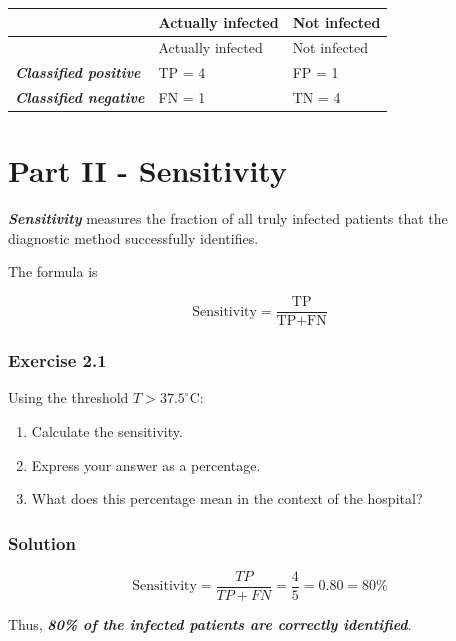 \documentclass[10pt]{article}
\begin{document}
\begingroup
\small
\setlength{\tabcolsep}{4pt}
\begin{longtable}{l|l|l}
\rule{0pt}{2.4ex} & Actually infected & Not infected \\[3pt]
\hline
\endfirsthead
\rule{0pt}{2.4ex} & Actually infected & Not infected \\[3pt]
\hline
\endhead
\textbf{\textit{Classified positive}} & TP = 4 & FP = 1 \\[1.5pt]
\textbf{\textit{Classified negative}} & FN = 1 & TN = 4 \\[1.5pt]
\end{longtable}
\endgroup
\par\endgroup

\clearpage
\section*{Part II - Sensitivity}
\textbf{\textit{Sensitivity}} measures the fraction of all truly infected patients that the diagnostic method successfully identifies.

The formula is

\[
{
\text{Sensitivity}
=
\frac{\text{TP}}{\text{TP}+\text{FN}}
}
\]

\subsubsection*{Exercise 2.1}
Using the threshold $T>37.5^\circ\mathrm{C}$:

\begin{enumerate}
\item
Calculate the sensitivity.

\item
Express your answer as a percentage.

\item
What does this percentage mean in the context of the hospital?

\end{enumerate}
\begingroup\color{red}

\subsubsection*{Solution}
\[
\text{Sensitivity}
=\frac{TP}{TP+FN}
=\frac{4}{5}
={0.80=80\%}
\]

Thus, \textbf{\textit{80\% of the infected patients are correctly identified}}.

\par\endgroup
\end{document}

